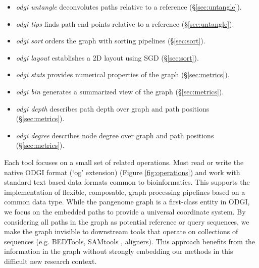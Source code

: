 \documentclass{bioinfo}
\begin{document}
\begin{itemize}
\item \textit{odgi untangle} deconvolutes paths relative to a reference (\S\ref{sec:untangle}).
\item \textit{odgi tips} finds path end points relative to a reference (\S\ref{sec:untangle}).
\item \textit{odgi sort} orders the graph with sorting pipelines (\S\ref{sec:sort}).
\item \textit{odgi layout} establishes a 2D layout using SGD (\S\ref{sec:sort}).
\item \textit{odgi stats} provides numerical properties of the graph (\S\ref{sec:metrics}).
\item \textit{odgi bin} generates a summarized view of the graph (\S\ref{sec:metrics}).
\item \textit{odgi depth} describes path depth over graph and path positions (\S\ref{sec:metrics}).
\item \textit{odgi degree} describes node degree over graph and path positions (\S\ref{sec:metrics}).
\end{itemize}

Each tool focuses on a small set of related operations.
Most read or write the native ODGI format (`og' extension) (Figure \ref{fig:operations}) and work with standard text based data formats common to bioinformatics.
This supports the implementation of flexible, composable, graph processing pipelines based on a common data type.
While the pangenome graph is a first-class entity in ODGI, we focus on the embedded paths to provide a universal coordinate system.
By considering all paths in the graph as potential reference or query sequences, we make the graph invisible to downstream tools that operate on collections of sequences (e.g. BEDTools, SAMtools \citep{Li2009}, aligners).
This approach benefits from the information in the graph without strongly embedding our methods in this difficult new research context.


\end{document}

